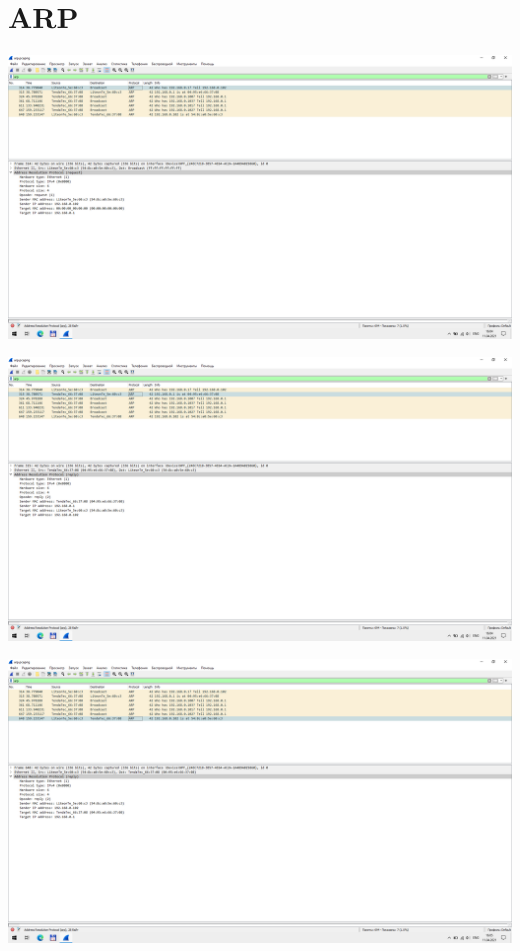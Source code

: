 
\section{ARP}

\includegraphics[width=\textwidth]{screenshots/arp_request_1}

\includegraphics[width=\textwidth]{screenshots/arp_response_1}

\includegraphics[width=\textwidth]{screenshots/arp_setup_1}
